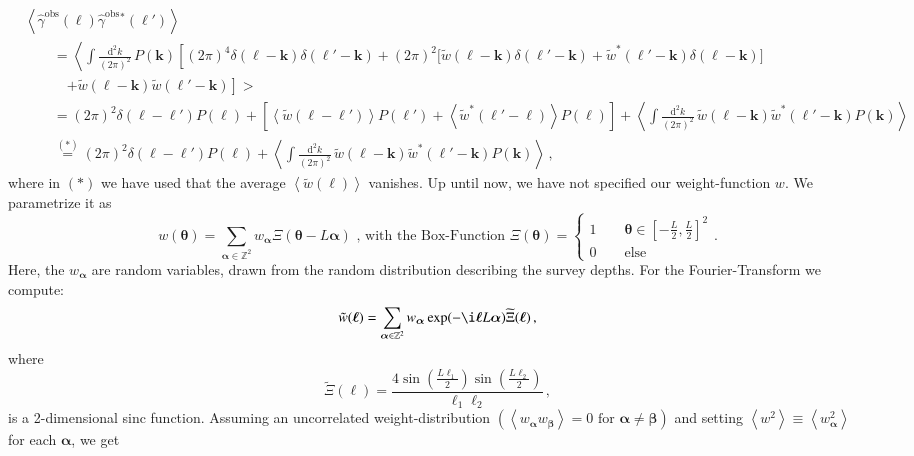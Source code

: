 \documentclass[referee]{aa} %
\renewcommand{\[}{\begin{equation}}
\renewcommand{\]}{\end{equation}}
\def\b#1{\bm{#1}}
\def\la{\left<}
\def\ra{\right>}
\def\gammaoh{\hat{\gamma}^{\text{obs}}}
\begin{document}
\begin{appendix}
\begin{align}
& \la \gammaoh(\b \ell) \gammaoh {}^*(\b \ell')\ra \nonumber\\
 &\qquad = \la \int\frac{\text{d}^2 k}{(2\pi)^2} \, P(\b k) \left[ (2\pi)^4\delta(\b \ell-\b k)\delta(\b \ell'-\b k)+(2\pi)^2\big[ \tilde{w}(\b \ell-\b k)\delta(\b \ell'-\b k) + \tilde{w}^*(\b \ell'-\b k)\delta(\b \ell-\b k)\big]\right.\right. \nonumber\\
 & \quad\qquad \left.\left. + \tilde{w}(\b \ell-\b k)\tilde{w}(\b \ell'-\b k) \right] \right. \bigg> \nonumber\\
 &\qquad =  (2\pi)^2\delta(\b \ell-\b \ell')P(\b \ell) + \left[ \la \tilde{w}(\b \ell-\b \ell')\ra P(\b \ell')+\la \tilde{w}^*(\b \ell'-\b \ell)\ra P(\b \ell)\right] + \la \int \frac{\text{d}^2 k}{(2\pi)^2} \, \tilde{w}(\b \ell-\b k)\tilde{w}^*(\b \ell'-\b k)P(\b k)\ra \nonumber\\
& \qquad \overset{(*)}{=}  (2\pi)^2\delta(\b \ell-\b \ell')P(\b \ell) + \la \int \frac{\text{d}^2 k}{(2\pi)^2}\, \tilde{w}(\b \ell-\b k)\tilde{w}^*(\b \ell'-\b k)P(\b k)\ra \, ,
\label{eq:pobs1}
\end{align}
where in $(*)$ we have used that the average $\la \tilde{w}(\b \ell)\ra$ vanishes.
Up until now, we have not specified our weight-function $w$. We parametrize it as \begin{equation}
w(\b \theta) = \sum_{\b \alpha \in \mathbb{Z}^2} w_{\b \alpha} \Xi(\b \theta-L\b \alpha)\text{ , with the Box-Function } \Xi(\b \theta) = \begin{cases}
1 \qquad \b \theta\in \left[-\frac{L}{2},\frac{L}{2}\right]^2 \\
0 \qquad \text{else}
\end{cases}.
\end{equation}
Here, the $w_{\b \alpha}$ are random variables, drawn from the random distribution describing the survey depths. For the Fourier-Transform we compute: \begin{equation}
\tilde{w}(\b \ell) = \sum_{\b \alpha \in \mathbb{Z}^2} w_{\b \alpha} \exp(-\i \b \ell L\b \alpha) \widetilde{\Xi}(\b \ell)\, ,
\end{equation}
where
\begin{equation}
\widetilde{\Xi}(\b\ell) = \frac{4\sin\left(\frac{L\ell_1}{2}\right)\sin\left(\frac{L\ell_2}{2}\right)}{\ell_1\ell_2}\, ,
\end{equation}
is a 2-dimensional sinc function.
Assuming an uncorrelated weight-distribution $\left(\la w_{\b \alpha} w_{\b \beta}\ra = 0\text{ for }\b \alpha\neq\b \beta\right)$ and setting $\la w^2\ra \equiv \la w_{\b \alpha}^2\ra$ for each $\b \alpha$, we get

\end{appendix}
\end{document}

